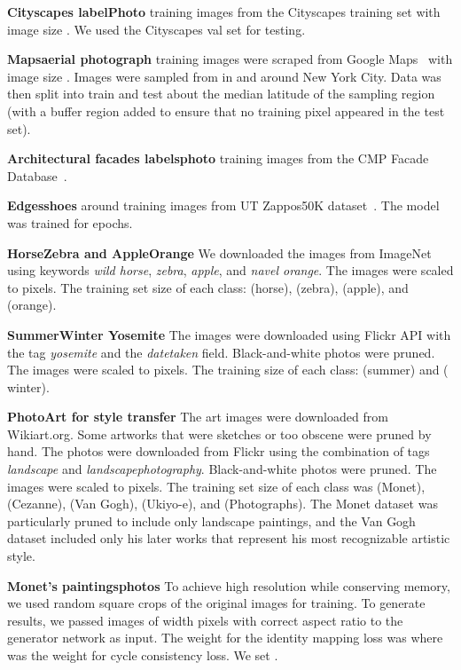 \documentclass[10pt,twocolumn,letterpaper]{article}
\begin{document}
{\bf Cityscapes labelPhoto}  training images from the Cityscapes training set \cite{Cordts2016Cityscapes} with image size . We used the Cityscapes val set for testing.

{\bf Mapsaerial photograph}  training images were scraped from Google Maps~\cite{isola2016image} with image size . Images were sampled from in and around New York City. Data was then split into train and test about the median latitude of the sampling region (with a buffer region added to ensure that no training pixel appeared in the test set).


{\bf Architectural facades labelsphoto}  training images from the CMP Facade Database~\cite{Tylecek13}.

{\bf Edgesshoes} around  training images from UT Zappos50K dataset~\cite{yu2014fine}. The model was trained for  epochs. 

{\bf HorseZebra and AppleOrange} We downloaded the images from ImageNet~\cite{deng2009imagenet} using keywords \textit{wild horse}, \textit{zebra}, \textit{apple}, and \textit{navel orange}. The images were scaled to  pixels. The training set size of each class:  (horse),  (zebra),  (apple), and  (orange).

{\bf SummerWinter Yosemite} The images were downloaded using Flickr API with the tag \textit{yosemite} and the \textit{datetaken} field. Black-and-white photos were pruned. The images were scaled to  pixels. The training size of each class:  (summer) and  ( winter).

{\bf PhotoArt for style transfer} The art images were downloaded from Wikiart.org. Some artworks that were sketches or too obscene were pruned by hand. The photos were downloaded from Flickr using the combination of tags \textit{landscape} and \textit{landscapephotography}. Black-and-white photos were pruned. The images were scaled to  pixels. The training set size of each class was  (Monet),  (Cezanne),  (Van Gogh),   (Ukiyo-e), and  (Photographs). The Monet dataset was particularly pruned to include only landscape paintings, and the Van Gogh dataset  included only his later works that represent his most recognizable artistic style. 

{\bf Monet's paintingsphotos} To achieve high resolution while conserving memory, we used random square crops of the original images for training. To generate results, we passed images of width  pixels with correct aspect ratio to the generator network as input. The weight for the identity mapping loss was  where  was the weight for cycle consistency loss. We set .
\end{document}
